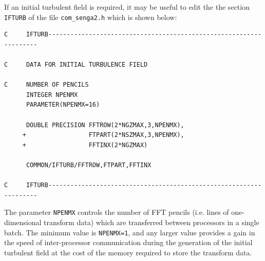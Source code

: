 \documentclass[dvips]{article}
\begin{document}
If an initial turbulent field is required, it may be useful to edit the
the section {\tt IFTURB} of the file {\tt com\_senga2.h} which is shown
below:
\begin{verbatim}
C     IFTURB-------------------------------------------------------------------

C     DATA FOR INITIAL TURBULENCE FIELD

C     NUMBER OF PENCILS
      INTEGER NPENMX
      PARAMETER(NPENMX=16)

      DOUBLE PRECISION FFTROW(2*NGZMAX,3,NPENMX),
     +                 FTPART(2*NSZMAX,3,NPENMX),
     +                 FFTINX(2*NGZMAX)

      COMMON/IFTURB/FFTROW,FTPART,FFTINX

C     IFTURB-------------------------------------------------------------------
\end{verbatim}
The parameter {\tt NPENMX} controls the number of FFT pencils (i.e. lines of
one-dimensional transform data) which are transferred between processors
in a single batch.  The minimum value is {\tt NPENMX=1}, and any larger
value provides a gain in the speed of inter-processor communication during the
generation of the initial turbulent field at the cost of the memory
required to store the transform data.\\
\end{document}
